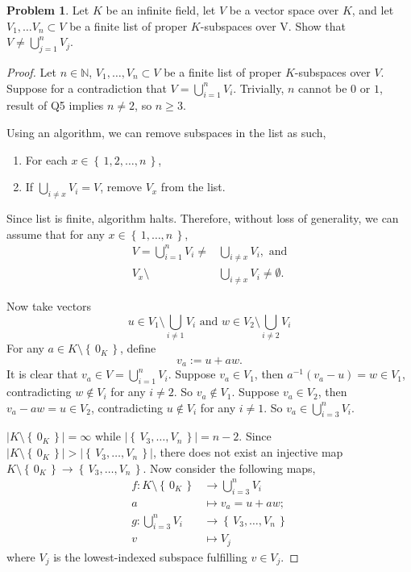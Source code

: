 \documentclass{article}
\theoremstyle{definition}
\newtheorem{problem}{Problem}
\numberwithin{equation}{problem}
\newcommand{\N}{\mathbb{N}}
\newcommand{\set}[1]{\left\{\,#1\,\right\}}
\begin{document}
\begin{problem}
    Let $K$ be an infinite field, let $V$ be a vector space over $K$,
    and let $V_1, \dots V_n \subset V$ be a finite list of proper $K$-subspaces over V.
    Show that $V \neq \displaystyle\bigcup_{j=1}^n V_j$.
\end{problem}
\begin{proof}
    Let $n\in \N$, $V_1, \dots, V_n \subset V$ be a finite list of proper $K$-subspaces over $V$.
    Suppose for a contradiction that $V = \displaystyle\bigcup_{i=1}^n V_i$.
    Trivially, $n$ cannot be $0$ or $1$, result of Q5 implies $n \ne 2$, so $n \ge 3$.

    Using an algorithm, we can remove subspaces in the list as such,
    \begin{enumerate}
        \item For each $x \in \set{1,2,\dots,n}$,
        \item If $\displaystyle\bigcup_{i\ne x} V_i = V$,
            remove $V_x$ from the list.
    \end{enumerate}
    Since list is finite, algorithm halts.
    Therefore, without loss of generality, we can assume that for any $x \in \set{1,\dots,n}$,
    \begin{align*}
        V = \bigcup_{i=1}^n V_i \ne &\bigcup_{i\ne x} V_i, \text{ and}   \\
        V_x \setminus &\bigcup_{i \ne x} V_i \ne \emptyset.
    \end{align*}

    Now take vectors
    $$ u \in V_1 \setminus \bigcup_{i\ne 1} V_i \text{ and } w \in V_2\setminus \bigcup_{i\ne 2} V_i $$
    For any $a\in K \setminus \set{0_K}$, define
    $$v_a := u + aw.$$
    It is clear that $v_a \in V = \displaystyle\bigcup_{i=1}^n V_i$.
%
    Suppose $v_a \in V_1$, then $a^{-1}(v_a - u) = w \in V_1$, contradicting $w \notin V_i$ for any $i \ne 2$.
    So $v_a \notin V_1$.
    Suppose $v_a \in V_2$, then $v_a - aw = u \in V_2$, contradicting $u \not\in V_i$ for any $i \ne 1$.
    So $v_a \in \displaystyle\bigcup_{i=3}^n V_i$.

    $|K \setminus\set{0_K} | = \infty$ while $|\set{V_3, \dots, V_n}| = n- 2$.
    Since $|K \setminus\set{0_K} | > |\set{V_3, \dots, V_n}|$, there does not exist an injective map
    $K \setminus\set{0_K} \to \set{V_3, \dots, V_n}$.
    Now consider the following maps,
    \begin{align*}
        f: K\setminus\set{0_K} &\to \bigcup_{i=3}^n V_i    \\
            a &\mapsto v_a = u + aw; \\
        g: \bigcup_{i=3}^n V_i &\to \set{V_3, \dots, V_n}   \\
            v &\mapsto V_j
    \end{align*}
    where $V_j$ is the lowest-indexed subspace fulfilling $v \in V_j$.


\end{proof}
\end{document}
